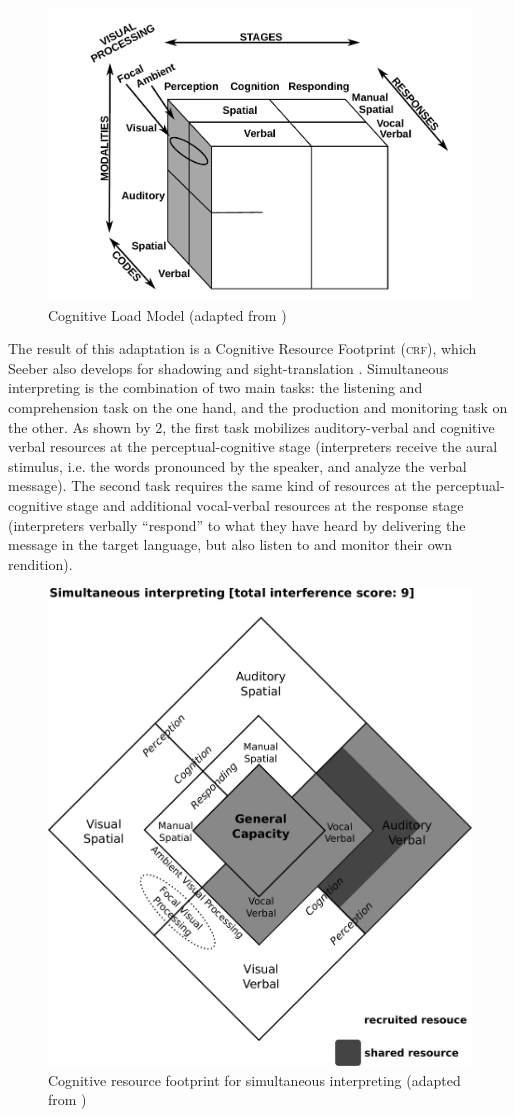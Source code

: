 \documentclass[output=paper]{langsci/langscibook}
\begin{document}
\begin{figure}
	\includegraphics[width=.7\textwidth]{figures/wickenstiescube.pdf}
\caption{Cognitive Load Model (adapted from \citealt[163]{Wickens2002})\label{fig:prandi:1}}
\end{figure}

The result of this adaptation is a Cognitive Resource Footprint (\textsc{crf}), which Seeber also develops for shadowing and sight-translation \citep{Seeber2007}. Simultaneous interpreting is the combination of two main tasks: the listening and comprehension task on the one hand, and the production and monitoring task on the other. As shown by 2, the first task mobilizes auditory-verbal and cognitive verbal resources at the perceptual-cognitive stage (interpreters receive the aural stimulus, i.e. the words pronounced by the speaker, and analyze the verbal message). The second task requires the same kind of resources at the perceptual-cognitive stage and additional vocal-verbal resources at the response stage (interpreters verbally ``respond'' to what they have heard by delivering the message in the target language, but also listen to and monitor their own rendition).

\begin{figure}
	\includegraphics[width=.6\textwidth]{figures/Seeberlozenge.pdf}
	\caption{\label{fig:prandi:2}Cognitive resource footprint for simultaneous interpreting (adapted from \citealt[1385]{Seeber2007})}
\end{figure}
 
\end{document}
